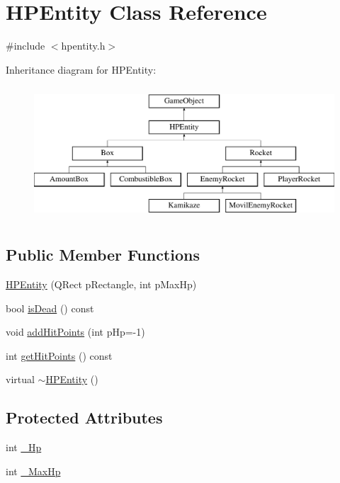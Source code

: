 \hypertarget{class_h_p_entity}{\section{H\-P\-Entity Class Reference}
\label{class_h_p_entity}
}


{\ttfamily \#include $<$hpentity.\-h$>$}

Inheritance diagram for H\-P\-Entity\-:\begin{figure}[H]
\begin{center}
\leavevmode
\includegraphics[height=5.000000cm]{class_h_p_entity}
\end{center}
\end{figure}
\subsection*{Public Member Functions}
\begin{DoxyCompactItemize}
\item 
\hyperlink{class_h_p_entity_a3351ec6d47cbf4e5c178b54e056adcbe}{H\-P\-Entity} (Q\-Rect p\-Rectangle, int p\-Max\-Hp)
\item 
bool \hyperlink{class_h_p_entity_a43761d5af8e1883911c3e3b7ad9170df}{is\-Dead} () const 
\item 
void \hyperlink{class_h_p_entity_a9cd0830a4369e036069aba8bdd37f703}{add\-Hit\-Points} (int p\-Hp=-\/1)
\item 
int \hyperlink{class_h_p_entity_ab66e8858b5562dd629052cd3770479c0}{get\-Hit\-Points} () const 
\item 
virtual \hyperlink{class_h_p_entity_a583b0e71da4f6e1446768e74f5c392dd}{$\sim$\-H\-P\-Entity} ()
\end{DoxyCompactItemize}
\subsection*{Protected Attributes}
\begin{DoxyCompactItemize}
\item 
int \hyperlink{class_h_p_entity_a3d72ffce5b3a795816229b5cfb1e221d}{\-\_\-\-Hp}
\item 
int \hyperlink{class_h_p_entity_a484307e81bbf22dbc7fdc11d0ee1c7d3}{\-\_\-\-Max\-Hp}
\end{DoxyCompactItemize}
